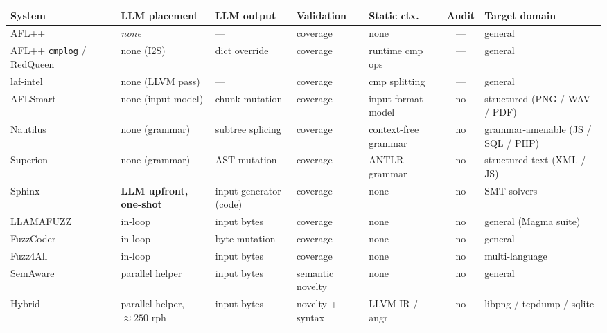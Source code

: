 \documentclass[11pt]{article}
\begin{document}
\begin{table}[H]
  \centering
  \tiny
  \setlength{\tabcolsep}{3pt}
  \renewcommand{\arraystretch}{1.1}
  \begin{tabularx}{\textwidth}{@{}L Y{15mm} Y{22mm} Y{22mm} Y{22mm} c Y{30mm}@{}}
    \toprule
    System & LLM placement & LLM output & Validation & Static ctx. & Audit & Target domain \\
    \midrule
    AFL++~\cite{aflplusplus}        & \emph{none}      & ---             & coverage        & none           & ---  & general                 \\
    AFL++ \texttt{cmplog} / RedQueen~\cite{aschermann2019redqueen} & none (I2S) & dict override   & coverage        & runtime cmp ops & ---  & general                 \\
    laf-intel~\cite{lafintel2016}  & none (LLVM pass) & ---             & coverage        & cmp splitting  & ---  & general                 \\
    AFLSmart~\cite{pham2019aflsmart} & none (input model) & chunk mutation & coverage      & input-format model & no  & structured (PNG / WAV / PDF) \\
    Nautilus~\cite{aschermann2019nautilus} & none (grammar) & subtree splicing & coverage   & context-free grammar & no & grammar-amenable (JS / SQL / PHP) \\
    Superion~\cite{wang2019superion} & none (grammar)  & AST mutation    & coverage        & ANTLR grammar  & no   & structured text (XML / JS) \\
    Sphinx~\cite{sun2024sphinx}     & \textbf{LLM upfront, one-shot} & input generator (code) & coverage & none & no & SMT solvers \\
    LLAMAFUZZ~\cite{wang2024llamafuzz} & in-loop       & input bytes     & coverage        & none           & no   & general (Magma suite)   \\
    FuzzCoder~\cite{liu2024fuzzcoder}  & in-loop       & byte mutation   & coverage        & none           & no   & general                 \\
    Fuzz4All~\cite{xia2024fuzz4all}    & in-loop       & input bytes     & coverage        & none           & no   & multi-language          \\
    SemAware~\cite{semanticaware2025}  & parallel helper & input bytes   & semantic novelty& none           & no   & general                 \\
    Hybrid~\cite{lin2025hybrid}        & parallel helper, $\approx250$ rph & input bytes & novelty + syntax & LLVM-IR / angr & no & libpng / tcpdump / sqlite \\

\end{tabularx}
\end{table}
\end{document}
